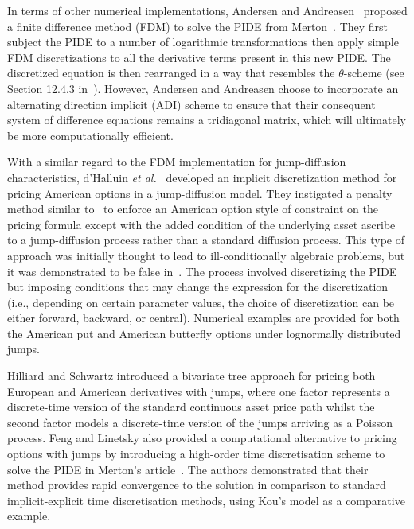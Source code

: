 In terms of other numerical implementations, Andersen and Andreasen~\cite{Andersen2000} proposed a finite difference method (FDM) to solve the PIDE from Merton~\cite{Merton1976}. They first subject the PIDE to a number of logarithmic transformations then apply simple FDM discretizations to all the derivative terms present in this new PIDE. The discretized equation is then rearranged in a way that resembles the $\theta$-scheme (see Section 12.4.3 in~\cite{Cont2004}). However, Andersen and Andreasen choose to incorporate an alternating direction implicit (ADI) scheme to ensure that their consequent system of difference equations remains a tridiagonal matrix, which will ultimately be more computationally efficient.

With a similar regard to the FDM implementation for jump-diffusion characteristics, d'Halluin \emph{et al.}~\cite{dHalluin2004} developed an implicit discretization method for pricing American options in a jump-diffusion model. They instigated a penalty method similar to~\cite{Forsyth2002} to enforce an American option style of constraint on the pricing formula except with the added condition of the underlying asset ascribe to a jump-diffusion process rather than a standard diffusion process. This type of approach was initially thought to lead to ill-conditionally algebraic problems, but it was demonstrated to be false in~\cite{Forsyth2002}. The process involved discretizing the PIDE but imposing conditions that may change the expression for the discretization (i.e., depending on certain parameter values, the choice of discretization can be either forward, backward, or central). Numerical examples are provided for both the American put and American butterfly options under lognormally distributed jumps.

Hilliard and Schwartz \cite{Hilliard2005} introduced a bivariate tree approach for pricing both European and American derivatives with jumps, where one factor represents a discrete-time version of the standard continuous asset price path whilst the second factor models a discrete-time version of the jumps arriving as a Poisson process. Feng and Linetsky \cite{Feng2008} also provided a computational alternative to pricing options with jumps by introducing a high-order time discretisation scheme to solve the PIDE in Merton's article~\cite{Merton1976}. The authors demonstrated that their method provides rapid convergence to the solution in comparison to standard implicit-explicit time discretisation methods, using Kou's model as a comparative example.

